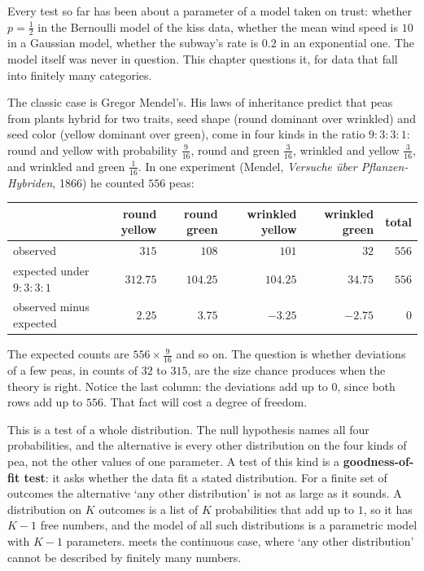 Every test so far has been about a parameter of a model taken on trust: whether $p = \frac12$ in the Bernoulli model of the kiss data, whether the mean wind speed is $10$ in a Gaussian model, whether the subway's rate is $0.2$ in an exponential one.
The model itself was never in question.
This chapter questions it, for data that fall into finitely many categories.

The classic case is Gregor Mendel's.
His laws of inheritance predict that peas from plants hybrid for two traits, seed shape (round dominant over wrinkled) and seed color (yellow dominant over green), come in four kinds in the ratio $9:3:3:1$: round and yellow with probability $\frac{9}{16}$, round and green $\frac{3}{16}$, wrinkled and yellow $\frac{3}{16}$, and wrinkled and green $\frac{1}{16}$.
In one experiment (Mendel, \textit{Versuche über Pflanzen-Hybriden}, 1866) he counted $556$ peas:

\begin{center}
\small
\begin{tabular}{@{}lrrrrr@{}}
\toprule
 & round yellow & round green & wrinkled yellow & wrinkled green & total \\
\midrule
observed & $315$ & $108$ & $101$ & $32$ & $556$ \\
expected under $9:3:3:1$ & $312.75$ & $104.25$ & $104.25$ & $34.75$ & $556$ \\
observed minus expected & $2.25$ & $3.75$ & $-3.25$ & $-2.75$ & $0$ \\
\bottomrule
\end{tabular}
\end{center}

The expected counts are $556 \times \frac{9}{16}$ and so on.
The question is whether deviations of a few peas, in counts of $32$ to $315$, are the size chance produces when the theory is right.
Notice the last column: the deviations add up to $0$, since both rows add up to $556$.
That fact will cost a degree of freedom.

This is a test of a whole distribution.
The null hypothesis names all four probabilities, and the alternative is every other distribution on the four kinds of pea, not the other values of one parameter.
A test of this kind is a \textbf{goodness-of-fit test}: it asks whether the data fit a stated distribution.
For a finite set of outcomes the alternative `any other distribution' is not as large as it sounds.
A distribution on $K$ outcomes is a list of $K$ probabilities that add up to $1$, so it has $K - 1$ free numbers, and the model of all such distributions is a parametric model with $K - 1$ parameters.
 meets the continuous case, where `any other distribution' cannot be described by finitely many numbers.

